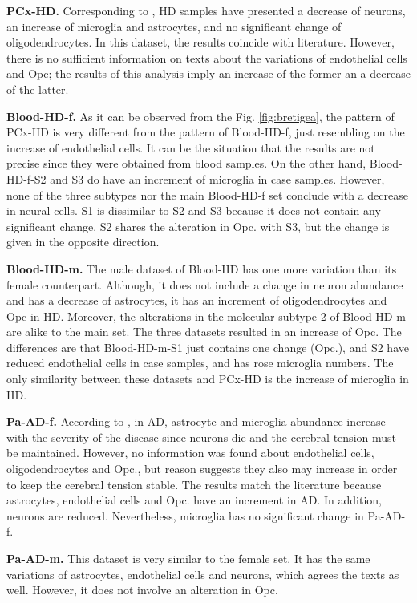 \textbf{PCx-HD.} Corresponding to \cite{bookHD}, HD samples have presented a decrease of neurons, an increase of microglia and astrocytes, and no significant change of oligodendrocytes. In this dataset, the results coincide with literature. However, there is no sufficient information on texts about the variations of endothelial cells and Opc; the results of this analysis imply an increase of the former an a decrease of the latter.

\textbf{Blood-HD-f.} As it can be observed from the Fig. \ref{fig:bretigea}, the pattern of PCx-HD is very different from the pattern of Blood-HD-f, just resembling on the increase of endothelial cells. It can be the situation that the results are not precise since they were obtained from blood samples. On the other hand, Blood-HD-f-S2 and S3 do have an increment of microglia in case samples. However, none of the three subtypes nor the main Blood-HD-f set conclude with a decrease in neural cells. S1 is dissimilar to S2 and S3 because it does not contain any significant change. S2 shares the alteration in Opc. with S3, but the change is given in the opposite direction.

\textbf{Blood-HD-m.} The male dataset of Blood-HD has one more variation than its female counterpart. Although, it does not include a change in neuron abundance and has a decrease of astrocytes, it has an increment of oligodendrocytes and Opc in HD. Moreover, the alterations in the molecular subtype 2 of Blood-HD-m are alike to the main set. The three datasets resulted in an increase of Opc. The differences are that Blood-HD-m-S1 just contains one change (Opc.), and S2 have reduced endothelial cells in case samples, and has rose microglia numbers. The only similarity between these datasets and PCx-HD is the increase of microglia in HD.

\textbf{Pa-AD-f.} According to \cite{ekonomou}, in AD, astrocyte and microglia abundance increase with the severity of the disease since neurons die and the cerebral tension must be maintained. However, no information was found about endothelial cells, oligodendrocytes and Opc., but reason suggests they also may increase in order to keep the cerebral tension stable. The results match the literature because astrocytes, endothelial cells and Opc. have an increment in AD. In addition, neurons are reduced. Nevertheless, microglia has no significant change in Pa-AD-f.

\textbf{Pa-AD-m.} This dataset is very similar to the female set. It has the same variations of astrocytes, endothelial cells and neurons, which agrees the texts as well. However, it does not involve an alteration in Opc.

